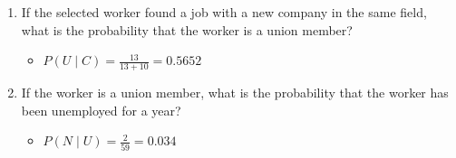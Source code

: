 \documentclass[basic, header]{nosvagor-notes} \usepackage{nosvagor-math}
\begin{document}
\begin{enumerate}[itemsep=8em]
\begin{enumerate}
      \item  If the selected worker found a job with a new company in the
        same field, what is the probability that the worker is a union member?
        \begin{itemize}
          \item \(\displaystyle P(U \mid C) = \frac{13}{13+10} = 0.5652 \)

        \end{itemize}
      \item  If the worker is a union member, what is the probability that
        the worker has been unemployed for a year?
        \begin{itemize}
          \item \(\displaystyle P(N \mid U) = \frac{2}{59} = 0.034\)

        \end{itemize}

    \end{enumerate}

\end{enumerate}
\end{document}
